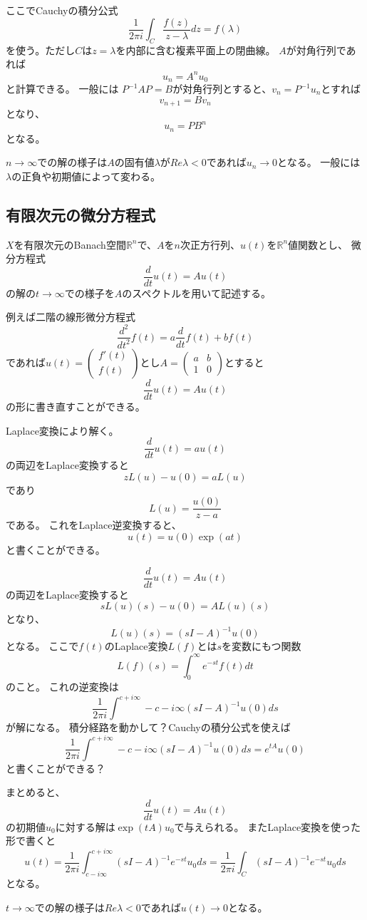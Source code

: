 \documentclass{jsarticle}
\newcommand{\R}{\mathbb{R}}
\begin{document}
ここでCauchyの積分公式
\[
\frac{1}{2\pi i}\int_C\frac{f(z)}{z-\lambda}dz=f(\lambda)
\]
を使う。ただし$C$は$z=\lambda$を内部に含む複素平面上の閉曲線。
$A$が対角行列であれば
\[
u_n=A^nu_0
\]
と計算できる。
一般には
$P^{-1}AP=B$が対角行列とすると、$v_n=P^{-1}u_n$とすれば
\[
v_{n+1}=Bv_n
\]
となり、
\[
u_n=PB^n
\]
となる。

$n\to\infty$での解の様子は$A$の固有値$\lambda$が$Re \lambda<0$であれば$u_n\to0$となる。
一般には$\lambda$の正負や初期値によって変わる。

\subsection{有限次元の微分方程式}
$X$を有限次元のBanach空間$\R^n$で、$A$を$n$次正方行列、$u(t)$を$\R^n$値関数とし、
微分方程式
\[
\frac{d}{dt}u(t)=Au(t)
\]
の解の$t\to\infty$での様子を$A$のスペクトルを用いて記述する。

例えば二階の線形微分方程式
\[
\frac{d^2}{dt^2}f(t)=a\frac{d}{dt}f(t)+bf(t)
\]
であれば$u(t)=\begin{pmatrix}f'(t)\\f(t)\end{pmatrix}$とし$A=\begin{pmatrix}a&b\\1&0\end{pmatrix}$とすると
\[
\frac{d}{dt}u(t)=Au(t)
\]
の形に書き直すことができる。

Laplace変換により解く。
\[
\frac{d}{dt}u(t)=au(t)
\]
の両辺をLaplace変換すると
\[
zL(u) -u(0)=aL(u)
\]
であり
\[
L(u)=\frac{u(0)}{z-a}
\]
である。
これをLaplace逆変換すると、
\[
u(t)=u(0)\exp(at)
\]
と書くことができる。


\[
\frac{d}{dt}u(t)=Au(t)
\]
の両辺をLaplace変換すると
\[
sL(u)(s)-u(0)=AL(u)(s)
\]
となり、
\[
L(u)(s)=(sI-A)^{-1}u(0)
\]
となる。
ここで$f(t)$のLaplace変換$L(f)$とは$s$を変数にもつ関数
\[
L(f)(s)=\int^\infty_0e^{-st}f(t)dt
\]
のこと。
これの逆変換は
\[
\frac{1}{2\pi i}\int^{c+i\infty}-{c-i\infty}(sI-A)^{-1}u(0)ds
\]
が解になる。
積分経路を動かして？Cauchyの積分公式を使えば
\[
\frac{1}{2\pi i}\int^{c+i\infty}-{c-i\infty}(sI-A)^{-1}u(0)ds=e^{tA}u(0)
\]
と書くことができる？

まとめると、
\[
\frac{d}{dt}u(t)=Au(t)
\]
の初期値$u_0$に対する解は$\exp(tA)u_0$で与えられる。
またLaplace変換を使った形で書くと
\[
u(t)=\frac{1}{2\pi i}\int_{c-i\infty}^{c+i\infty}(sI-A)^{-1}e^{-st}u_0ds=\frac{1}{2\pi i}\int_C(sI-A)^{-1}e^{-st}u_0ds
\]
となる。

$t\to\infty$での解の様子は$Re \lambda<0$であれば$u(t)\to0$となる。
\end{document}
